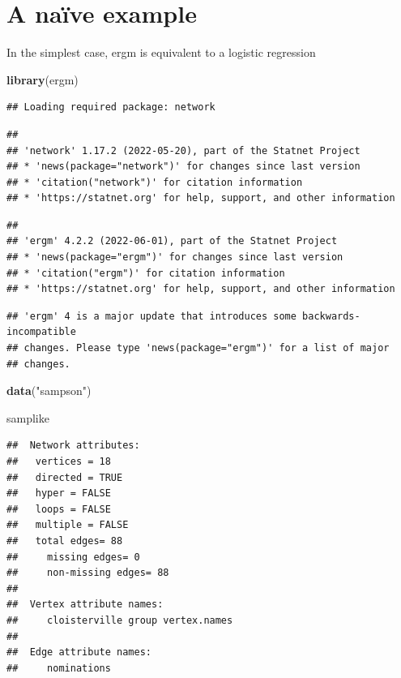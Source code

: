 \documentclass[]{book}
\newenvironment{Shaded}{\begin{snugshade}}{\end{snugshade}}
\newcommand{\KeywordTok}[1]{\textcolor[rgb]{0.13,0.29,0.53}{\textbf{#1}}}
\newcommand{\NormalTok}[1]{#1}
\newcommand{\StringTok}[1]{\textcolor[rgb]{0.31,0.60,0.02}{#1}}
\begin{document}
\hypertarget{a-nauxefve-example}{%
\section{A naïve example}\label{a-nauxefve-example}}

In the simplest case, ergm is equivalent to a logistic regression

\begin{Shaded}
\begin{Highlighting}[]
\KeywordTok{library}\NormalTok{(ergm)}
\end{Highlighting}
\end{Shaded}

\begin{verbatim}
## Loading required package: network
\end{verbatim}

\begin{verbatim}
## 
## 'network' 1.17.2 (2022-05-20), part of the Statnet Project
## * 'news(package="network")' for changes since last version
## * 'citation("network")' for citation information
## * 'https://statnet.org' for help, support, and other information
\end{verbatim}

\begin{verbatim}
## 
## 'ergm' 4.2.2 (2022-06-01), part of the Statnet Project
## * 'news(package="ergm")' for changes since last version
## * 'citation("ergm")' for citation information
## * 'https://statnet.org' for help, support, and other information
\end{verbatim}

\begin{verbatim}
## 'ergm' 4 is a major update that introduces some backwards-incompatible
## changes. Please type 'news(package="ergm")' for a list of major
## changes.
\end{verbatim}

\begin{Shaded}
\begin{Highlighting}[]
\KeywordTok{data}\NormalTok{(}\StringTok{"sampson"}\NormalTok{)}

\NormalTok{samplike}
\end{Highlighting}
\end{Shaded}

\begin{verbatim}
##  Network attributes:
##   vertices = 18 
##   directed = TRUE 
##   hyper = FALSE 
##   loops = FALSE 
##   multiple = FALSE 
##   total edges= 88 
##     missing edges= 0 
##     non-missing edges= 88 
## 
##  Vertex attribute names: 
##     cloisterville group vertex.names 
## 
##  Edge attribute names: 
##     nominations
\end{verbatim}
\end{document}
